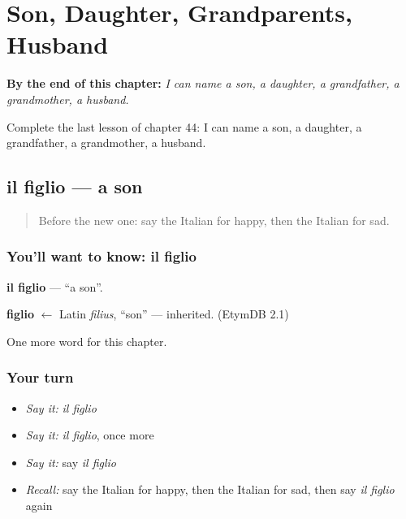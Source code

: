 
\chapter{Son, Daughter, Grandparents, Husband}
\label{ch:it-son-daughter-grandparents-husband}

\begin{chapteropening}
\textbf{By the end of this chapter:} \emph{I can name a son, a daughter, a grandfather, a grandmother, a husband.}

Complete the last lesson of chapter 44: I can name a son, a daughter, a grandfather, a grandmother, a husband.
\end{chapteropening}

\section[il figlio]{il figlio — a son}

\label{lesson:IT-C44-figlio}



\begin{quote}
Before the new one: say the Italian for happy, then the Italian for sad.
\end{quote}

\subsection*{You'll want to know: il figlio}
\textbf{il figlio} — \textquotedblleft{}a son\textquotedblright{}.

\begin{cousinweb}
\textbf{figlio} $\leftarrow$ Latin \emph{filius}, \textquotedblleft{}son\textquotedblright{} — inherited. (EtymDB 2.1)
\end{cousinweb}

\begin{grammarlens}[title={What you've built}]
One more word for this chapter.
\end{grammarlens}

\subsection*{Your turn}
\begin{itemize}
\raggedright
  \item \emph{Say it:} \emph{il figlio}
  \item \emph{Say it:} \emph{il figlio}, once more
  \item \emph{Say it:} say \emph{il figlio}
  \item \emph{Recall:} say the Italian for happy, then the Italian for sad, then say \emph{il figlio} again
\end{itemize}

